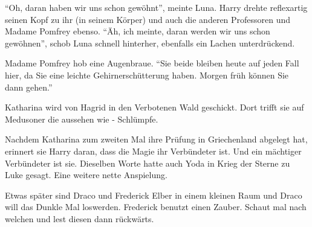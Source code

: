 \enquote{Oh, daran haben wir uns schon gewöhnt}, meinte Luna. Harry drehte reflexartig seinen Kopf zu ihr (in seinem Körper) und auch die anderen Professoren und Madame Pomfrey ebenso. \enquote{Äh, ich meinte, daran werden wir uns schon gewöhnen}, schob Luna schnell hinterher, ebenfalls ein Lachen unterdrückend.

Madame Pomfrey hob eine Augenbraue. \enquote{Sie beide bleiben heute auf jeden Fall hier, da Sie eine leichte Gehirnerschütterung haben. Morgen früh können Sie dann gehen.}




\begin{kommentar}
Katharina wird von Hagrid in den Verbotenen Wald geschickt. Dort trifft sie auf Medusoner die aussehen wie - Schlümpfe.
\end{kommentar}

\begin{kommentar}
Nachdem Katharina zum zweiten Mal ihre Prüfung in Griechenland abgelegt hat, erinnert sie Harry daran, dass die Magie ihr Verbündeter ist. Und ein mächtiger Verbündeter ist sie.
Dieselben Worte hatte auch Yoda in Krieg der Sterne zu Luke gesagt. Eine weitere nette Anspielung.
\end{kommentar}

\begin{kommentar}
Etwas später sind Draco und Frederick Elber in einem kleinen Raum und Draco will das Dunkle Mal loswerden. Frederick benutzt einen Zauber. Schaut mal nach welchen und lest diesen dann rückwärts.
\end{kommentar}
